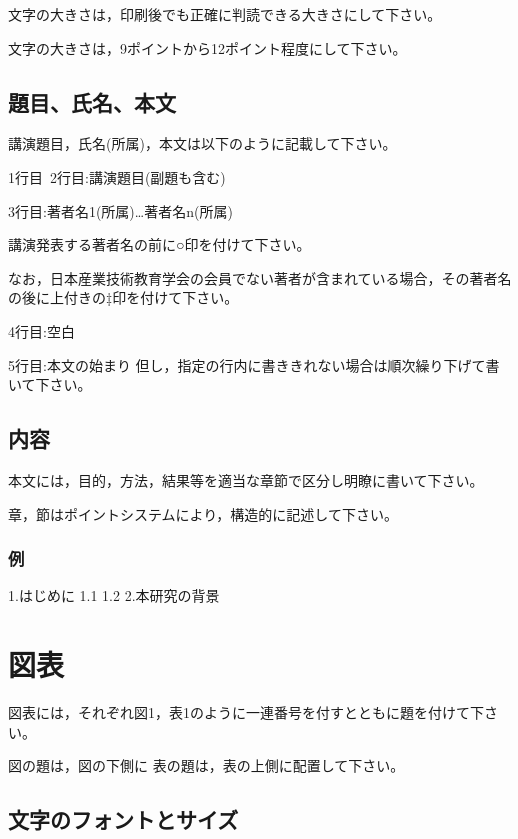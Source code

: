 \documentclass[uplatex, dvipdfmx]{jste-ist}
\begin{document}
文字の大きさは，印刷後でも正確に判読できる大きさにして下さい。

文字の大きさは，9ポイントから12ポイント程度にして下さい。

\subsection{題目、氏名、本文}

講演題目，氏名(所属)，本文は以下のように記載して下さい。

1行目~2行目:講演題目(副題も含む)

3行目:著者名1(所属)…著者名n(所属)

講演発表する著者名の前に○印を付けて下さい。

なお，日本産業技術教育学会の会員でない著者が含まれている場合，その著者名の後に上付きの‡印を付けて下さい。

4行目:空白

5行目:本文の始まり 但し，指定の行内に書ききれない場合は順次繰り下げて書いて下さい。

\subsection{内容}

本文には，目的，方法，結果等を適当な章節で区分し明瞭に書いて下さい。

章，節はポイントシステムにより，構造的に記述して下さい。

\subsubsection{例}

1.はじめに 1.1 1.2 2.本研究の背景

\section{図表}

図表には，それぞれ図1，表1のように一連番号を付すとともに題を付けて下さい。

図の題は，図の下側に
表の題は，表の上側に配置して下さい。


\subsection{文字のフォントとサイズ}
\end{document}
